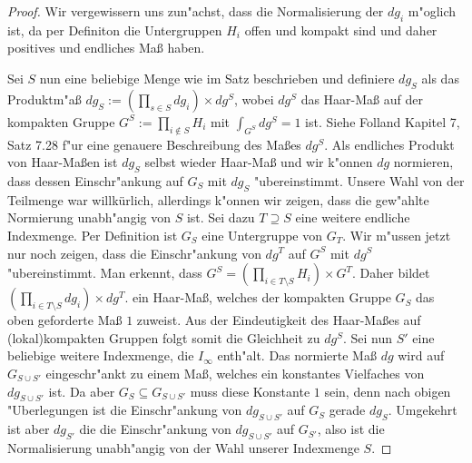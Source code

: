 		\begin{proof}
			Wir vergewissern uns zun"achst, dass die Normalisierung der $dg_i$ m"oglich ist, da per Definiton die Untergruppen $H_i$ offen und kompakt sind und daher positives und endliches Maß haben.
			
			Sei $S$ nun eine beliebige Menge wie im Satz beschrieben und definiere $dg_S$ als das Produktm"aß $dg_S :=\left(\prod_{s \in S}dg_i\right) \times dg^S$, wobei $dg^S$ das Haar-Maß auf der kompakten Gruppe $G^S:=\prod_{i \notin S} H_i$ mit $\int_{G^S} dg^S = 1$ ist. 
			Siehe Folland \cite{folland} Kapitel 7, Satz 7.28 f"ur eine genauere Beschreibung des Maßes $dg^S$. 
			Als endliches Produkt von Haar-Maßen ist $dg_S$ selbst wieder Haar-Maß und wir k"onnen $dg$ normieren, dass dessen Einschr"ankung auf $G_S$ mit $dg_S$ "ubereinstimmt.
			Unsere Wahl von der Teilmenge war willkürlich, allerdings k"onnen wir zeigen, dass die gew"ahlte Normierung unabh"angig von $S$ ist. Sei dazu $T\supseteq S$ eine weitere endliche Indexmenge. 
			Per Definition ist $G_S$ eine Untergruppe von $G_T$. 
			Wir m"ussen jetzt nur noch zeigen, dass die Einschr"ankung von $dg^T$ auf $G^S$ mit $dg^S$ "ubereinstimmt.
			Man erkennt, dass $G^S = \left(\prod_{i \in T \setminus S} H_i\right) \times G^T$. Daher bildet $\left(\prod_{i \in T \setminus S} dg_i\right) \times dg^T$.
			ein Haar-Maß, welches der kompakten Gruppe $G_S$ das oben geforderte Maß $1$ zuweist. Aus der Eindeutigkeit des Haar-Maßes auf (lokal)kompakten Gruppen folgt somit die Gleichheit zu $dg^S$.
			Sei nun $S'$ eine beliebige weitere Indexmenge, die $I_\infty$ enth"alt. Das normierte Maß $dg$ wird auf $G_{S\cup S'}$ eingeschr"ankt zu einem Maß, welches ein konstantes Vielfaches von $dg_{S\cup S'}$ ist. 
			Da aber $G_S \subseteq G_{S\cup S'}$ muss diese Konstante $1$ sein, denn nach obigen "Uberlegungen ist die Einschr"ankung von $dg_{S\cup S'}$ auf $G_S$ gerade $dg_{S}$.
			Umgekehrt ist aber $dg_{S'}$ die die Einschr"ankung von $dg_{S\cup S'}$ auf $G_{S'}$, also ist die Normalisierung unabh"angig von der Wahl unserer Indexmenge $S$.
		\end{proof}
		
